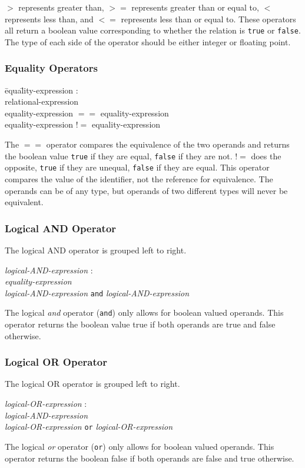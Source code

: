 \documentclass{article}
\begin{document}
$>$ represents greater than, $>=$ represents greater than or equal to, $<$ represents less than, and $<=$ represents less than or equal to. These operators all return a boolean value corresponding to whether the relation is \texttt{true} or \texttt{false}. The type of each side of the operator should be either integer or floating point.

\subsubsection{Equality Operators}
\begin{itshape}
\begin{tabbing}
	\= equa\=lity-expression : \\
		\>\> relational-expression \\
		\>\> equality-expression $==$ equality-expression \\		
		\>\> equality-expression $!=$ equality-expression
\end{tabbing}
\end{itshape}
The $==$ operator compares the equivalence of the two operands and returns the boolean value \texttt{true} if they are equal, \texttt{false} if they are not. $!=$ does the opposite, \texttt{true} if they are unequal, \texttt{false} if they are equal. This operator compares the value of the identifier, not the reference for equivalence. The operands can be of any type, but operands of two different types will never be equivalent.

\subsubsection{Logical AND Operator}
The logical AND operator is grouped left to right.
\begin{tabbing}
	\= \emph{logi}\=\emph{cal-AND-expression} : \\
		\>\> \emph{equality-expression} \\
		\>\> \emph{logical-AND-expression} \texttt{and} \emph{logical-AND-expression} 
\end{tabbing}
The logical \emph{and} operator (\texttt{and}) only allows for boolean valued operands. This operator returns the boolean value true if both operands are true and false otherwise. 

\subsubsection{Logical OR Operator}
The logical OR operator is grouped left to right.
\begin{tabbing}
	\= \emph{logi}\=\emph{cal-OR-expression} : \\
		\>\> \emph{logical-AND-expression} \\
		\>\> \emph{logical-OR-expression} \texttt{or} \emph{logical-OR-expression} 
\end{tabbing}
The logical \emph{or} operator (\texttt{or}) only allows for boolean valued operands. This operator returns the boolean false if both operands are false and true otherwise.
\end{document}
